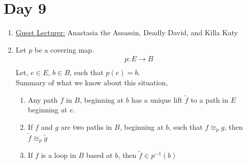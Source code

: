 \section{Day 9}
    \begin{enumerate}
        \item \underline{Guest Lecturer:} Anastasia the Assassin, Deadly David, and Killa Katy
        \item Let $p$ be a covering map.
            \begin{align*}
                p: E\rightarrow B\\
            \end{align*}
            Let, $e\in E$, $b\in B$, such that $p(e)=b$.\\
            Summary of what we know about this situation,
            \begin{enumerate}
                \item Any path $f$ in $B$, beginning at $b$ has a unique lift $\tilde{f}$ to a path in $E$ beginning at $e$.
                \item If $f$ and $g$ are two paths in $B$, beginning at $b$, such that $f\cong_{p}g$, then
                    $\tilde{f}\cong_{p}\tilde{g}$
                \item If $f$ is a loop in $B$ based at $b$, then $\tilde{f}\in p^{-1}(b)$
            \end{enumerate}
    \end{enumerate}
